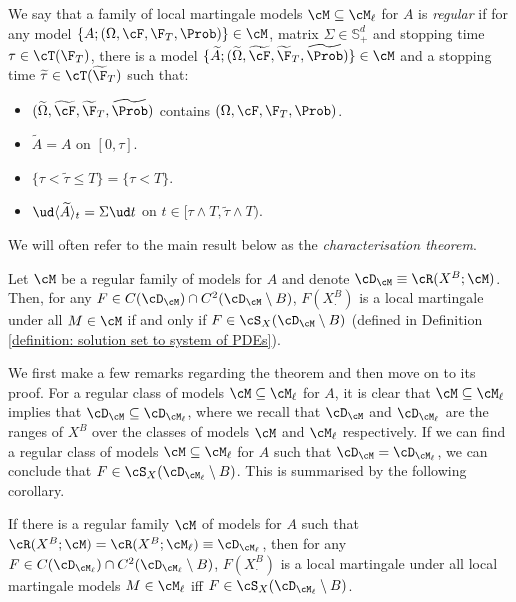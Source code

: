 \documentclass[11pt]{article}
\begin{document}
\begin{definition}
\label{definition: regular class of models}
We say that a family of local martingale models $\cM \subseteq \cM_{\ell}$ for $A$ is \textit{regular} if for any model $\{ A; (\Omega, \cF, \F_T, \Prob)\} \in \cM$, matrix $\Sigma \in \mathbb{S}^d_+$ and stopping time $\tau \in \cT(\F_T)$, there is a model $\{\widetilde{A}; (\widetilde{\Omega},\widetilde{\cF},\widetilde{\F}_T,\widetilde{\Prob})\} \in \cM$ and a stopping time $\widetilde{\tau} \in \cT(\widetilde{\F}_T)$ such that:
\begin{itemize}
\item $(\widetilde{\Omega},\widetilde{\cF},\widetilde{\F}_T,\widetilde{\Prob})$ contains $(\Omega, \cF, \F_T, \Prob)$.
\item $\widetilde{A} = A$ on $[0,\tau]$.
\item $\{ \tau < \widetilde{\tau} \leq T \} = \{ \tau < T \}$.
\item $\ud \langle \widetilde{A} \rangle_t = \Sigma \ud t$ on $t \in [\tau \wedge T, \widetilde{\tau} \wedge T)$.
\end{itemize}
\end{definition}

We will often refer to the main result below as the \textit{characterisation theorem}. 

\begin{theorem}
\label{theorem: characterisation of local martingales}
Let $\cM$ be a regular family of models for $A$ and denote $\cD_\cM \equiv \cR(X^B; \cM)$. Then, for any $F \in C(\cD_{\cM}) \cap C^2(\cD_{\cM} \setminus B)$, $F(X^B_\cdot)$ is a local martingale under all $M \in \cM$ if and only if $F \in \cS_X(\cD_{\cM} \setminus B)$ (defined in Definition \ref{definition: solution set to system of PDEs}).
\end{theorem}

We first make a few remarks regarding the theorem and then move on to its proof. For a regular class of models $\cM \subseteq \cM_{\ell}$ for $A$, it is clear that $\cM \subseteq \cM_\ell$ implies that $\cD_{\cM} \subseteq \cD_{\cM_\ell}$, where we recall that $\cD_{\cM}$ and $\cD_{\cM_\ell}$ are the ranges of $X^B$ over the classes of models $\cM$ and $\cM_\ell$ respectively. If we can find a regular class of models $\cM \subseteq \cM_\ell$ for $A$ such that $\cD_{\cM} = \cD_{\cM_\ell}$, we can conclude that  $F \in \cS_X(\cD_{\cM_\ell} \setminus B)$. This is summarised by the following corollary.


\begin{corollary}
If there is a regular family $\cM$ of models for $A$ such that $\cR(X^B; \cM) = \cR(X^B; \cM_{\ell}) \equiv \cD_{\cM_{\ell}}$, then for any $F \in C(\cD_{\cM_{\ell}}) \cap C^2(\cD_{\cM_{\ell}} \setminus B)$, $F(X^B_\cdot)$ is a local martingale under all local martingale models $M \in \cM_{\ell}$ iff $F \in \cS_X(\cD_{\cM_{\ell}} \setminus B)$.
\end{corollary}
\end{document}
